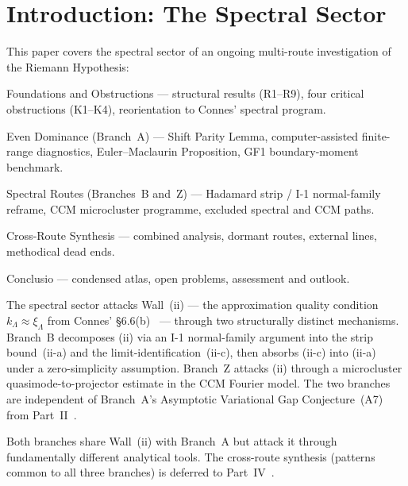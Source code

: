 \documentclass[12pt,a4paper]{article}
\theoremstyle{definition}
\theoremstyle{remark}
\begin{document}
\clearpage
\tableofcontents
\clearpage


\section{Introduction: The Spectral Sector}
\label{sec:intro}

This paper covers the spectral sector of an ongoing multi-route
investigation of the Riemann Hypothesis:
\begin{description}[font=\bfseries,leftmargin=2em]
  \item[Part~I \cite{Geiger2026partI}:] Foundations and Obstructions ---
    structural results (R1--R9), four critical obstructions (K1--K4),
    reorientation to Connes' spectral program.
  \item[Part~II \cite{Geiger2026partII}:] Even Dominance (Branch~A) ---
    Shift Parity Lemma, computer-assisted finite-range diagnostics,
    Euler--Maclaurin Proposition, GF1 boundary-moment benchmark.
  \item[Part~III (this paper):] Spectral Routes (Branches~B and~Z) ---
    Hadamard strip / I-1 normal-family reframe, CCM microcluster
    programme, excluded spectral and CCM paths.
  \item[Part~IV \cite{Geiger2026partIV}:] Cross-Route Synthesis ---
    combined analysis, dormant routes, external lines, methodical dead
    ends.
  \item[Part~V \cite{Geiger2026partV}:] Conclusio --- condensed atlas,
    open problems, assessment and outlook.
\end{description}

The spectral sector attacks Wall~(ii) --- the approximation quality
condition $k_\Lambda \approx \xi_\Lambda$ from Connes'
\S6.6(b)~\cite{Connes2026} --- through two structurally distinct
mechanisms. Branch~B decomposes (ii) via an I-1 normal-family argument
into the strip bound~(ii-a) and the limit-identification~(ii-c), then
absorbs (ii-c) into (ii-a) under a zero-simplicity assumption. Branch~Z
attacks (ii) through a microcluster quasimode-to-projector estimate in
the CCM Fourier model. The two branches are independent of Branch~A's
Asymptotic Variational Gap Conjecture~(A7)
from Part~II~\cite{Geiger2026partII}.

Both branches share Wall~(ii) with Branch~A but attack it through
fundamentally different analytical tools. The cross-route synthesis
(patterns common to all three branches) is deferred to
Part~IV~\cite{Geiger2026partIV}.
\end{document}

